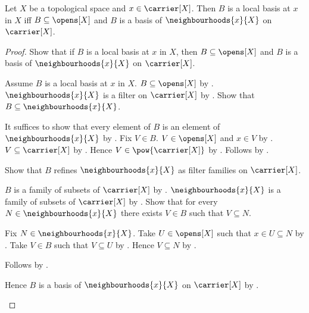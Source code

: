 \begin{theorem}\label{local_basis_iff_neighbourhood_filter_basis}
    Let $X$ be a topological space and $x\in\carrier[X]$.
    Then $B$ is a local basis at $x$ in $X$ iff
        $B\subseteq\opens[X]$ and
        $B$ is a basis of $\neighbourhoods{x}{X}$ on $\carrier[X]$.
\end{theorem}
\begin{proof}
    Show that if $B$ is a local basis at $x$ in $X$, then
        $B\subseteq\opens[X]$ and
        $B$ is a basis of $\neighbourhoods{x}{X}$ on $\carrier[X]$.
    \begin{subproof}
        Assume $B$ is a local basis at $x$ in $X$.
        $B\subseteq\opens[X]$ by .
        $\neighbourhoods{x}{X}$ is a filter on $\carrier[X]$
            by .
        Show that $B\subseteq\neighbourhoods{x}{X}$.
        \begin{subproof}
            It suffices to show that every element of $B$ is an element of
                $\neighbourhoods{x}{X}$ by .
            Fix $V\in B$.
            $V\in\opens[X]$ and $x\in V$ by .
            $V\subseteq\carrier[X]$ by .
            Hence $V\in\pow{\carrier[X]}$ by .
            Follows by .
        \end{subproof}
        Show that $B$ refines $\neighbourhoods{x}{X}$
            as filter families on $\carrier[X]$.
        \begin{subproof}
            $B$ is a family of subsets of $\carrier[X]$
                by .
            $\neighbourhoods{x}{X}$ is a family of subsets of $\carrier[X]$
                by .
            Show that for every $N\in\neighbourhoods{x}{X}$ there exists
                $V\in B$ such that $V\subseteq N$.
            \begin{subproof}
                Fix $N\in\neighbourhoods{x}{X}$.
                Take $U\in\opens[X]$ such that $x\in U\subseteq N$
                    by .
                Take $V\in B$ such that $V\subseteq U$
                    by .
                Hence $V\subseteq N$ by .
            \end{subproof}
            Follows by .
        \end{subproof}
        Hence $B$ is a basis of $\neighbourhoods{x}{X}$ on $\carrier[X]$
            by .
    \end{subproof}


\end{proof}
